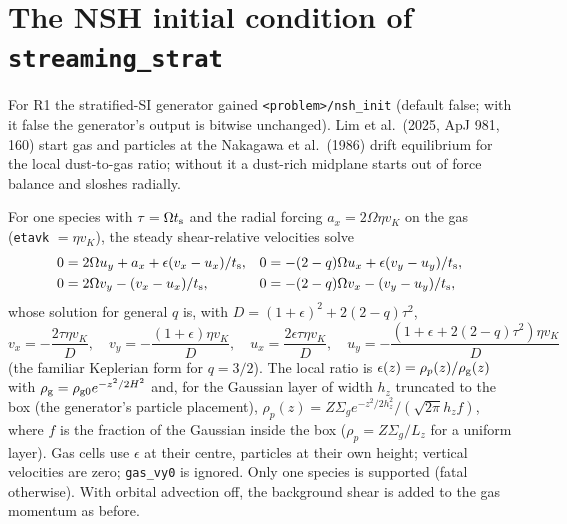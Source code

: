 \documentclass[11pt]{article}
\newcommand{\code}[1]{\texttt{#1}}
\newcommand{\ts}{t_{\rm s}}
\newcommand{\rhog}{\rho_{\rm g}}
\begin{document}
\section{The NSH initial condition of \code{streaming\_strat}}\label{sec:nsh}
For R1 the stratified-SI generator gained \code{<problem>/nsh\_init} (default false; with
it false the generator's output is bitwise unchanged). Lim et al.\ (2025, ApJ 981, 160)
start gas and particles at the Nakagawa et al.\ (1986) drift equilibrium for the local
dust-to-gas ratio; without it a dust-rich midplane starts out of force balance and
sloshes radially.

For one species with $\tau=\Omega\ts$ and the radial forcing $a_x=2\Omega\eta v_K$ on the
gas (\code{etavk} $=\eta v_K$), the steady shear-relative velocities solve
\begin{align}
 0&=2\Omega u_y+a_x+\epsilon(v_x-u_x)/\ts, &
 0&=-(2-q)\Omega u_x+\epsilon(v_y-u_y)/\ts,\\
 0&=2\Omega v_y-(v_x-u_x)/\ts, &
 0&=-(2-q)\Omega v_x-(v_y-u_y)/\ts ,
\end{align}
whose solution for general $q$ is, with $D=(1+\epsilon)^2+2(2-q)\tau^2$,
\begin{equation}
 v_x=-\frac{2\tau\eta v_K}{D},\quad v_y=-\frac{(1+\epsilon)\eta v_K}{D},\quad
 u_x=\frac{2\epsilon\tau\eta v_K}{D},\quad
 u_y=-\frac{(1+\epsilon+2(2-q)\tau^2)\eta v_K}{D}
\end{equation}
(the familiar Keplerian form for $q=3/2$). The local ratio is
$\epsilon(z)=\rho_p(z)/\rhog(z)$ with $\rhog=\rho_{\rm g0}e^{-z^2/2H^2}$ and, for the Gaussian
layer of width $h_z$ truncated to the box (the generator's particle placement),
$\rho_p(z)=Z\Sigma_g e^{-z^2/2h_z^2}/(\sqrt{2\pi}h_zf)$, where $f$ is the fraction of
the Gaussian inside the box ($\rho_p=Z\Sigma_g/L_z$ for a uniform layer). Gas cells use
$\epsilon$ at their centre, particles at their own height; vertical velocities are zero;
\code{gas\_vy0} is ignored. Only one species is supported (fatal otherwise). With
orbital advection off, the background shear is added to the gas momentum as before.

\end{document}
